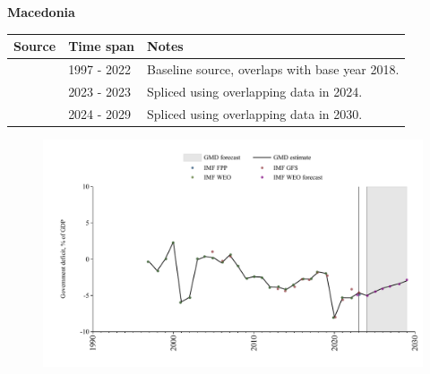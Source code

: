 \documentclass[12pt,a4paper,landscape]{article}
\begin{document}
\begin{adjustbox}{max totalsize={\paperwidth}{\paperheight},center}
\begin{minipage}[t][\textheight][t]{\textwidth}
\vspace*{0.5cm}
{}
\begin{center}
{\Large\bfseries Macedonia}
\end{center}
\vspace{0.5cm}
\begin{table}[H]
\centering
\small
\begin{tabular}{|l|l|l|}
\hline
\textbf{Source} & \textbf{Time span} & \textbf{Notes} \\
\hline
\rowcolor{white}\cite{IMF_WEO}& 1997 - 2022 &Baseline source, overlaps with base year 2018.\\
\rowcolor{lightgray}\cite{IMF_GFS}& 2023 - 2023 &Spliced using overlapping data in 2024.\\
\rowcolor{white}\cite{IMF_WEO_forecast}& 2024 - 2029 &Spliced using overlapping data in 2030.\\
\hline
\end{tabular}
\end{table}
\begin{figure}[H]
\centering
\includegraphics[width=\textwidth,height=0.6\textheight,keepaspectratio]{graphs/MKD_govdef_GDP.pdf}
\end{figure}
\end{minipage}
\end{adjustbox}
\end{document}

